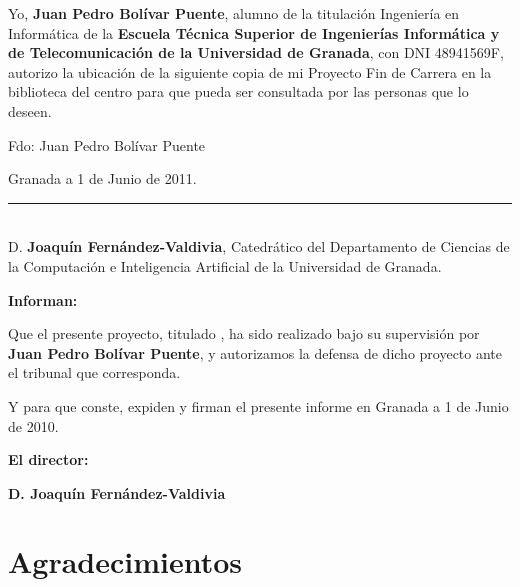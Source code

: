 Yo, \textbf{Juan Pedro Bolívar Puente}, alumno de la titulación
Ingeniería en Informática de la \textbf{Escuela Técnica Superior de
  Ingenierías Informática y de Telecomunicación de la Universidad de
  Granada}, con DNI 48941569F, autorizo la ubicación de la siguiente
copia de mi Proyecto Fin de Carrera en la biblioteca del centro para
que pueda ser consultada por las personas que lo deseen.

\vspace{6cm}
\noindent Fdo: Juan Pedro Bolívar Puente

\vspace{2cm}

\begin{flushright}
Granada a 1 de Junio de 2011.
\end{flushright}


\cleardoublepage
\thispagestyle{empty}
\noindent\rule[-1ex]{\textwidth}{2pt}\\[4.5ex]

D. \textbf{Joaquín Fernández-Valdivia}, Catedrático del Departamento
de Ciencias de la Computación e Inteligencia Artificial de la
Universidad de Granada.  \vspace{0.5cm}


\textbf{Informan:}
\vspace{0.5cm}

Que el presente proyecto, titulado \textit{\textbf{\myTitle}}, ha sido
realizado bajo su supervisión por \textbf{Juan Pedro Bolívar Puente}, y
autorizamos la defensa de dicho proyecto ante el tribunal que
corresponda.
\vspace{0.5cm}

Y para que conste, expiden y firman el presente informe en Granada a 1
de Junio de 2010.
\vspace{1cm}

\textbf{El director:}
\vspace{5cm}

\noindent 
\textbf{D. Joaquín Fernández-Valdivia}%

\chapter*{Agradecimientos}
\thispagestyle{empty}
\vspace{1cm}


\vspace{3cm}

